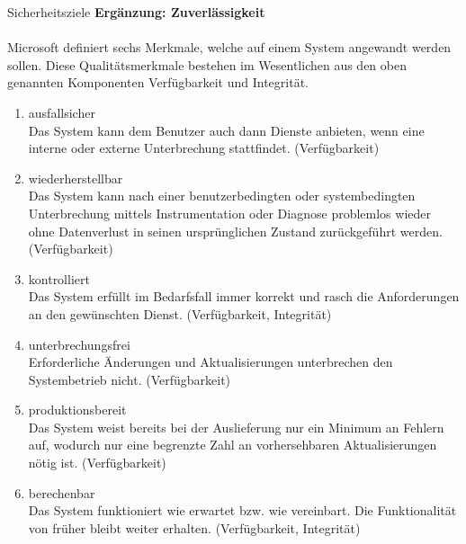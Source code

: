 \begin{section}{Sicherheitsziele}
   \label{Ergänzung: Zuverlässigkeit}
   \textbf{Ergänzung: Zuverlässigkeit} \\ \\
     Microsoft definiert sechs Merkmale, welche auf einem System angewandt werden sollen. 
     Diese Qualitätsmerkmale bestehen im Wesentlichen aus den oben genannten Komponenten 
     Verfügbarkeit und Integrität.
     \begin{enumerate} 
      \item ausfallsicher \\
       Das System kann dem Benutzer auch dann Dienste anbieten, wenn eine interne oder 
       externe Unterbrechung stattfindet. (Verfügbarkeit)
      \item wiederherstellbar \\
       Das System kann nach einer benutzerbedingten oder systembedingten Unterbrechung 
       mittels Instrumentation oder Diagnose problemlos wieder ohne Datenverlust in seinen 
       ursprünglichen Zustand zurückgeführt werden. (Verfügbarkeit)
      \item kontrolliert \\
       Das System erfüllt im Bedarfsfall immer korrekt und rasch die Anforderungen an den 
       gewünschten Dienst. (Verfügbarkeit, Integrität)
      \item unterbrechungsfrei \\
       Erforderliche Änderungen und Aktualisierungen unterbrechen den Systembetrieb nicht. 
       (Verfügbarkeit)
      \item produktionsbereit \\
       Das System weist bereits bei der Auslieferung nur ein Minimum an Fehlern auf, 
       wodurch nur eine begrenzte Zahl an vorhersehbaren Aktualisierungen nötig ist. 
       (Verfügbarkeit)
      \item berechenbar \\
       Das System funktioniert wie erwartet bzw. wie vereinbart. Die Funktionalität von 
       früher bleibt weiter erhalten. (Verfügbarkeit, Integrität) \\      
     \end{enumerate}
    \pagebreak
  \end{section}

